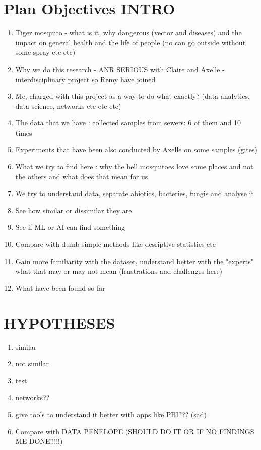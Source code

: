 \documentclass[acmlarge]{acmart}
\begin{document}
\section{Plan Objectives INTRO}
\begin{enumerate}
    \item Tiger mosquito - what is it, why dangerous (vector and diseases) and the impact on general health and the life of people (no can go outside without some spray etc etc)
    \item Why we do this research - ANR SERIOUS with Claire and Axelle - interdisciplinary project so Remy have joined
    \item Me, charged with this project as a way to do what exactly? (data analytics, data science, networks etc etc etc)
    \item The data that we have : collected samples from sewers: 6 of them and 10 times
    \item Experiments that have been also conducted by Axelle on some samples (gites)
    \item What we try to find here : why the hell mosquitoes love some places and not the others and what does that mean for us
    \item We try to understand data, separate abiotics, bacteries, fungis and analyse it
    \item See how similar or dissimilar they are
    \item See if ML or AI can find something
    \item Compare with dumb simple methods like desriptive statistics etc
    \item Gain more familiarity with the dataset, understand better with the "experts" what that may or may not mean (frustrations and challenges here)
    \item What have been found so far
\end{enumerate}

\section{HYPOTHESES}
\begin{enumerate}
    \item similar
    \item not similar
    \item test
    \item networks??
    \item give tools to understand it better with apps like PBI??? (sad)
    \item Compare with DATA PENELOPE (SHOULD DO IT OR IF NO FINDINGS ME DONE!!!!!)
\end{enumerate}
\end{document}
